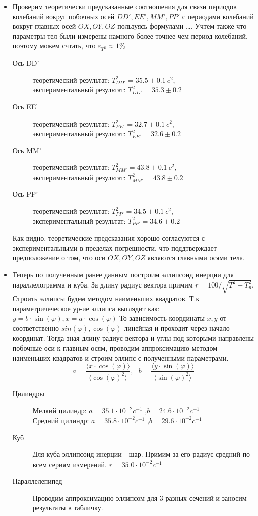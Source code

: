 \documentclass[a4paper,12pt]{article} %
\begin{document}
\begin{itemize}
    \item Проверим теоретически предсказанные соотношения для связи периодов
 колебаний вокруг побочных осей $DD',EE',MM',PP'$ с периодами колебаний вокруг главных осей $OX,OY,OZ$ пользуясь формулами \dots.
 Учтем также что параметры тел были измерены намного более точнее чем период колебаний, поэтому можем счтать, что $\varepsilon_{T^2} \approx 1\%$
\begin{description}
    \item[Ось DD']теоретический результат: $T^{2}_{DD'}=35.5 \pm 0.1 \ c^2$,\\ экспериментальный результат: $T^{2}_{DD'}=35.3 \pm 0.2$
    \item[Ось EE']теоретический результат: $T^{2}_{EE'}=32.7 \pm 0.1 \ c^2$,\\ экспериментальный результат: $T^{2}_{EE'}=32.6 \pm 0.2$
    \item[Ось MM']теоретический результат: $T^{2}_{MM'}=43.8 \pm 0.1 \ c^2$,\\ экспериментальный результат: $T^{2}_{MM'}=43.8 \pm 0.2$
    \item[Ось PP']теоретический результат: $T^{2}_{PP'}=34.5 \pm 0.1 \ c^2$,\\ экспериментальный результат: $T^{2}_{PP'}=34.6 \pm 0.2$
\end{description}
Как видно, теоретические предсказания хорошо согласуются с экспериментальными в пределах погрешности, что поддтверждает предположение о том,
 что оси $OX,OY,OZ$ являются главными осями тела.\\
    \item Теперь по полученным ранее данным построим эллипсоид инерции для параллелограмма и куба. За длину радиус вектора примим
$r=100/\sqrt{T^2-T^2_{p}}$. Строить эллипсы будем методом наименьших квадратов. Т.к параметричеческое ур-ие эллипса выглядит как:\\
$y=b \cdot \sin(\varphi), x= a \cdot \cos(\varphi)$ То зависимость координаты $x,y$ от соответственно $sin(\varphi),\cos(\varphi)$ линейная и
проходит через начало координат. Тогда зная 
длину радиус вектора и углы под которыми направлены побочные оси к главным осям, проводим аппроксимацию методом наименьших квадратов
 и строим эллипс с полученными параметрами.
$$a=\frac{\langle x \cdot \cos(\varphi)\rangle }{\langle \cos(\varphi)^2 \rangle }, \ \ \ b=\frac{\langle y \cdot \sin(\varphi)\rangle }{\langle \sin(\varphi)^2 \rangle }$$
\begin{description}
    \item[Цилиндры]Мелкий цилиндр: $a = 35.1 \cdot 10^{-2}c^{-1}$ ,$b = 24.6 \cdot 10^{-2}c^{-1}$\\
Средний цилиндр: $a = 35.8  \cdot 10^{-2}c^{-1}$ ,$b = 29.6 \cdot 10^{-2}c^{-1}$
    \item[Куб] Для куба эллипсоид инерции - шар. Примим за его радиус средний по
всем сериям измерений. $r = 35.0 \cdot 10^{-2}c^{-1}$
    \item[Параллелепипед]Проводим аппроксимацию эллипсом для 3 разных сечений
 и заносим результаты в табличку.
\end{description}


\end{itemize}
\end{document}
